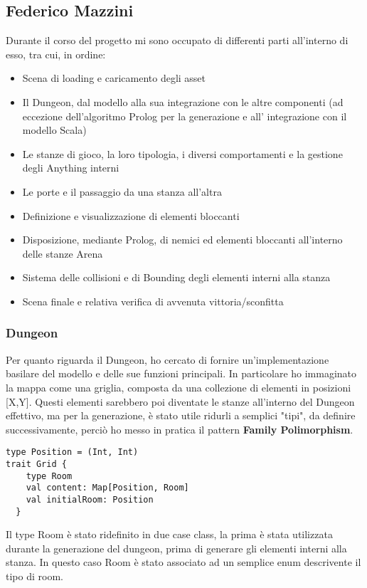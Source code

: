 \subsection{Federico Mazzini}
Durante il corso del progetto mi sono occupato di differenti parti all'interno di esso, tra cui, in ordine:
\begin{itemize}
    \item Scena di loading e caricamento degli asset
    \item Il Dungeon, dal modello alla sua integrazione con le altre componenti (ad eccezione dell'algoritmo Prolog per la generazione e all' integrazione con il modello Scala)
    \item Le stanze di gioco, la loro tipologia, i diversi comportamenti e la gestione degli Anything interni
    \item Le porte e il passaggio da una stanza all'altra
    \item Definizione e visualizzazione di elementi bloccanti
    \item Disposizione, mediante Prolog, di nemici ed elementi bloccanti all'interno delle stanze Arena
    \item Sistema delle collisioni e di Bounding degli elementi interni alla stanza
    \item Scena finale e relativa verifica di avvenuta vittoria/sconfitta
\end{itemize}

\subsubsection{Dungeon}
Per quanto riguarda il Dungeon, ho cercato di fornire un'implementazione basilare del modello e delle sue funzioni principali. 
In particolare ho immaginato la mappa come una griglia, composta da una collezione di elementi in posizioni [X,Y]. Questi elementi sarebbero poi diventate le stanze all'interno del Dungeon effettivo, 
ma per la generazione, è stato utile ridurli a semplici "tipi", da definire successivamente, perciò ho messo in pratica il pattern \textbf{Family Polimorphism}.

\begin{lstlisting}[basicstyle=\tiny]
type Position = (Int, Int)
trait Grid {
    type Room
    val content: Map[Position, Room]
    val initialRoom: Position
  }   
\end{lstlisting}
Il type Room è stato ridefinito in due case class, la prima è stata utilizzata durante la generazione del dungeon, prima di generare gli elementi interni alla stanza. 
In questo caso Room è stato associato ad un semplice enum descrivente il tipo di room. 

